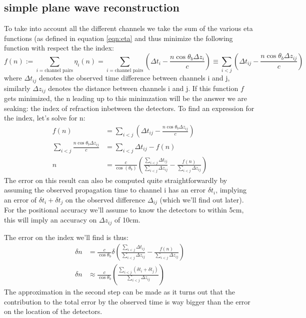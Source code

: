 \subsection{simple plane wave reconstruction}
\label{seq:SimplePW}
To take into account all the different channels we take the sum of the
various eta functions (as defined in equation \ref{eqn:eta} and
thus minimize the following function with respect the the index:
\begin{equation}
	f(n) := \sum_{i=\text{channel pairs}}\eta_i(n) = \sum_{i=\text{channel pairs}}\left( \Delta t_i - \frac{n\cos\theta_b \Delta z_i}{c}\right) \equiv \sum_{i<j}\left( \Delta t_{ij} - \frac{n\cos\theta_b \Delta z_{ij}}{c}\right)
  	\label{eqn:PlaneWave}
\end{equation}
where $\Delta t_{ij}$ denotes the observed time difference between
channels i and j, similarly $\Delta z_{ij}$ denotes the distance
between channels i and j.
If this function $f$ gets minimized, the n leading up to this minimzation
will be the answer we are seaking: the index of refraction inbetween
the detectors.  To find an expression for the index, let's solve for
n:
\begin{align}
	f(n) &= \sum_{i<j}\left( \Delta t_{ij} - \frac{n\cos\theta_b \Delta z_{ij}}{c}\right)\\
\sum_{i<j}\frac{n\cos\theta_b \Delta z_{ij}}{c}&=\sum_{i<j}\Delta t_{ij} - f(n)\\
	n &= \frac{c}{\cos(\theta_b)}\left(\frac{\sum_{i<j}\Delta t_{ij}}{\sum_{i<j} \Delta z_{ij}} - \frac{f(n)}{\sum_{i<j} \Delta z_{ij}}\right)
\end{align}
The error on this result can also be computed quite straightforwardly
by assuming the observed propagation time to channel i has an error
$\delta t_i$, implying an error of $\delta t_i + \delta t_j$ on the observed difference $\Delta_{ij}$ (which we'll find out later).
For the positional accuracy we'll assume to know the detectors to 
within 5cm, this will imply an accuracy on $\Delta z_{ij}$ of 10cm.

The error on the index we'll find is thus:
\begin{align}
	\delta n &= \frac{c}{\cos{\theta_b}}\delta\left(\frac{\sum_{i<j}\Delta t_{ij}}{\sum_{i<j} \Delta z_{ij}} - \frac{f(n)}{\sum_{i<j} \Delta z_{ij}}\right)\\
	\delta n &\approx \frac{c}{\cos{\theta_b}}\left(\frac{\sum_{i<j}(\delta t_{i} + \delta t_j)}{\sum_{i<j}\Delta z_{ij}}\right)
\end{align}
The approximation in the second step can be made as it turns out that the contribution to the total error by the
observed time is way bigger than the error on the location of the
detectors.

